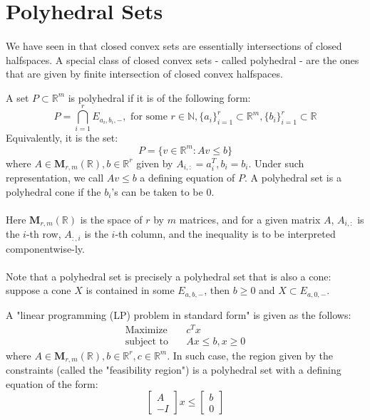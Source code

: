 \section{Polyhedral Sets}
\label{sect:017}

\paragraph{}We have seen in  that closed convex sets are essentially intersections of closed halfspaces. A special class of closed convex sets - called polyhedral - are the ones that are given by finite intersection of closed convex halfspaces.

\begin{defn}\label{defn:017-polyhedral-sets}
	A set $P\subset \mathbb{R}^m$ is polyhedral if it is of the following form:
	\[
		P=\bigcap_{i=1}^rE_{a_i,b_i,-},\text{ for some }r\in \mathbb{N},\{a_i\}_{i=1}^r\subset\mathbb{R}^m,\{b_i\}_{i=1}^r\subset\mathbb{R}
	\]
	Equivalently, it is the set:
	\[
		P=\{v\in \mathbb{R}^m:Av\leq b\}
	\]
	where $A\in \mathbf{M}_{r,m}(\mathbb{R}),b\in \mathbb{R}^r$ given by $A_{i,:}=a_i^T,b_i=b_i$. Under such representation, we call $Av\leq b$ a defining equation of $P$. A polyhedral set is a polyhedral cone if the $b_i$'s can be taken to be $0$.
\end{defn}

\paragraph{}Here $\mathbf{M}_{r,m}(\mathbb{R})$ is the space of $r$ by $m$ matrices, and for a given matrix $A$, $A_{i,:}$ is the $i$-th row, $A_{:,i}$ is the $i$-th column, and the inequality is to be interpreted componentwise-ly.

\paragraph{}Note that a polyhedral set is precisely a polyhedral set that is also a cone: suppose a cone $X$ is contained in some $E_{a,b,-}$, then $b\geq 0$ and $X\subset E_{a,0,-}$.

\begin{exmp}
	A "linear programming (LP) problem in standard form" is given as the follows:
	\begin{align*}
		\text{Maximize}\quad   & c^Tx              \\
		\text{subject to}\quad & Ax\leq b, x\geq 0
	\end{align*}
	where $A\in \mathbf{M}_{r,m}(\mathbb{R}),b\in \mathbb{R}^r,c\in \mathbb{R}^m$. In such case, the region given by the constraints (called the "feasibility region") is a polyhedral set with a defining equation of the form:
	\[
		\left[
			\begin{array}{r}
				A \\\hline
				-I
			\end{array}
			\right]
		x\leq
		\left[
			\begin{array}{r}
				b \\\hline
				0
			\end{array}
			\right]
	\]
\end{exmp}

